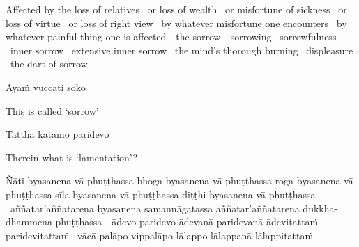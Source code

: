 \ifbfive\enlargethispage{1\baselineskip}\fi
\ifafive\clearpage\fi

\begin{english-hang-verses}
  Affected by the loss of relatives \breathmark\ or loss of wealth \breathmark\ or misfortune of sickness \breathmark\ or loss of virtue \breathmark\ or loss of right view\makeatletter\hyperlink{endnote84-appendix}\makeatother
 \breathmark\ by whatever misfortune one encounters \breathmark\ by whatever painful thing one is \mbox{affected}~\breathmark\ the \mbox{sorrow}~\breathmark\ sorrowing \breathmark\ sorrowfulness \breathmark\ inner sorrow \breathmark\ extensive inner sorrow \breathmark\ the mind's thorough burning \breathmark\ displeasure \breathmark\ the dart of sorrow
\end{english-hang-verses}

Ayaṁ vuccati soko

\begin{english}
  This is called `sorrow'
\end{english}

Tattha katamo paridevo

\begin{english}
  Therein what is `lamentation'?
\end{english}

\ifninebythirteen\clearpage\fi

\begin{pali-hang}
  Ñāti-byasanena vā phuṭṭhassa bhoga-byasanena vā phuṭṭhassa roga-byasanena vā phuṭṭhassa sīla-byasanena vā phuṭṭhassa diṭṭhi-byasanena vā phuṭṭhassa \breathmark\ aññatar'aññatarena byasanena samannāgatassa aññatar'aññatarena dukkha-dhammena \mbox{phuṭṭhassa}~\breathmark\ ādevo paridevo ādevanā paridevanā ādevitattaṁ paridevitattaṁ \breathmark\ vācā palāpo vippalāpo lālappo lālappanā lālappitattaṁ
\end{pali-hang}

